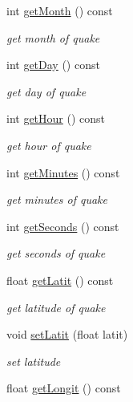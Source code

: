 \begin{DoxyCompactItemize}
int \mbox{\hyperlink{classbridges_1_1dataset_1_1_earthquake_u_s_g_s_a010247e7474cc2434fff823a1a8b1142}{get\+Month}} () const
\begin{DoxyCompactList}\small\item\em get month of quake \end{DoxyCompactList}\item 
int \mbox{\hyperlink{classbridges_1_1dataset_1_1_earthquake_u_s_g_s_a6052793e29a4d9708ebf35cb8477ed0d}{get\+Day}} () const
\begin{DoxyCompactList}\small\item\em get day of quake \end{DoxyCompactList}\item 
int \mbox{\hyperlink{classbridges_1_1dataset_1_1_earthquake_u_s_g_s_a43e64f31d62d11ad554be5f5388720f6}{get\+Hour}} () const
\begin{DoxyCompactList}\small\item\em get hour of quake \end{DoxyCompactList}\item 
int \mbox{\hyperlink{classbridges_1_1dataset_1_1_earthquake_u_s_g_s_a2ca08fed1bfc867277dbd99cf25fa3ec}{get\+Minutes}} () const
\begin{DoxyCompactList}\small\item\em get minutes of quake \end{DoxyCompactList}\item 
int \mbox{\hyperlink{classbridges_1_1dataset_1_1_earthquake_u_s_g_s_af91ae1415cc7e0b82a5d288b7e033cd0}{get\+Seconds}} () const
\begin{DoxyCompactList}\small\item\em get seconds of quake \end{DoxyCompactList}\item 
float \mbox{\hyperlink{classbridges_1_1dataset_1_1_earthquake_u_s_g_s_aea3eca11487e572ead2ed91197d3d387}{get\+Latit}} () const
\begin{DoxyCompactList}\small\item\em get latitude of quake \end{DoxyCompactList}\item 
void \mbox{\hyperlink{classbridges_1_1dataset_1_1_earthquake_u_s_g_s_a68e7b4a3f74e57c574a5d09dc36a27ae}{set\+Latit}} (float latit)
\begin{DoxyCompactList}\small\item\em set latitude \end{DoxyCompactList}\item 
float \mbox{\hyperlink{classbridges_1_1dataset_1_1_earthquake_u_s_g_s_aab856d62ca076b54fff0e2b2a6b131d9}{get\+Longit}} () const

\end{DoxyCompactItemize}
